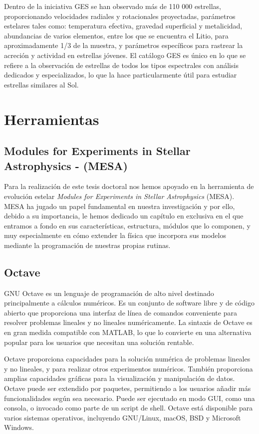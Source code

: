 Dentro de la iniciativa GES se han observado más de 110 000 estrellas, proporcionando velocidades radiales y rotacionales proyectadas, parámetros estelares tales como: temperatura efectiva, gravedad superficial y metalicidad, abundancias de varios elementos, entre los que se encuentra el Litio, para aproximadamente 1/3 de la muestra, y parámetros específicos para rastrear la acreción y actividad en estrellas jóvenes. El catálogo GES es único en lo que se refiere a la observación de estrellas de todos los tipos espectrales con análisis dedicados y especializados, lo que la hace particularmente útil para estudiar estrellas similares al Sol.\par


\section{Herramientas}
\subsection{Modules for Experiments in Stellar Astrophysics - (MESA)}
Para la realización de este tesis doctoral nos hemos apoyado en la herramienta de evolución estelar \textit{Modules for Experiments in Stellar Astrophysics} (MESA). MESA ha jugado un papel fundamental en nuestra investigación y por ello, debido a su importancia, le hemos dedicado un capítulo en exclusiva en el que entramos a fondo en sus características, estructura, módulos que lo componen, y muy especialmente en cómo extender la física que incorpora sus modelos mediante la programación de nuestras propias rutinas.\par


\subsection{Octave} \label{sec:tool_octave}
GNU Octave es un lenguaje de programación de alto nivel destinado principalmente a cálculos numéricos. Es un conjunto de software libre y de código abierto que proporciona una interfaz de línea de comandos conveniente para resolver problemas lineales y no lineales numéricamente. La sintaxis de Octave es en gran medida compatible con MATLAB, lo que lo convierte en una alternativa popular para los usuarios que necesitan una solución rentable. 

Octave proporciona capacidades para la solución numérica de problemas lineales y no lineales, y para realizar otros experimentos numéricos. También proporciona amplias capacidades gráficas para la visualización y manipulación de datos. Octave puede ser extendido por paquetes, permitiendo a los usuarios añadir más funcionalidades según sea necesario. Puede ser ejecutado en modo GUI, como una consola, o invocado como parte de un script de shell. Octave está disponible para varios sistemas operativos, incluyendo GNU/Linux, macOS, BSD y Microsoft Windows.

